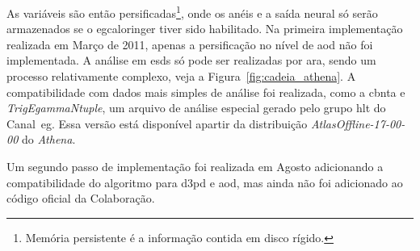 As variáveis são então persificadas\footnote{Memória persistente é a informação
contida em disco rígido.}, onde os anéis e a saída neural só serão armazenados
se o \gls{egcaloringer} tiver sido habilitado. Na primeira implementação
realizada em Março de 2011, apenas a persificação no nível de \gls{aod} não foi
implementada. A análise em \glspl{esd} só pode ser realizadas por \gls{ara},
sendo um processo relativamente complexo, veja a Figura~\ref{fig:cadeia_athena}.
A compatibilidade com dados mais simples de análise foi realizada, como a
\gls{cbnta} e \emph{TrigEgammaNtuple}, um arquivo de análise especial gerado
pelo grupo \gls{hlt} do Canal~\gls{eg}. Essa versão está disponível apartir da
distribuição \emph{AtlasOffline-17-00-00} do \emph{Athena}.

Um segundo passo de implementação foi realizada em Agosto adicionando a
compatibilidade do algoritmo para \gls{d3pd} e \gls{aod}, mas ainda não foi
adicionado ao código oficial da Colaboração.



